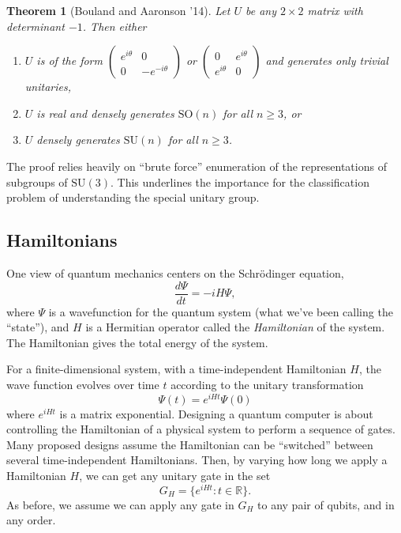 \documentclass[11pt]{report}
\theoremstyle{plain}
\newtheorem{theorem}{Theorem}[section]
\theoremstyle{definition}
\newcommand{\R}{{\mathbb R}}
\begin{document}
\begin{theorem}[Bouland and Aaronson '14]
Let $U$ be any $2 \times 2$ matrix with determinant $-1$. Then either
\begin{enumerate}
\item $U$ is of the form $\left(\begin{smallmatrix} e^{i\theta} & 0 \\ 0 & -e^{-i\theta} \end{smallmatrix}\right)$ or $\left(\begin{smallmatrix} 0 & e^{i\theta} \\ e^{i\theta} & 0 \end{smallmatrix}\right)$ and generates only trivial unitaries,
\item $U$ is real and densely generates $\mathrm{SO}(n)$ for all $n \geq 3$, or
\item $U$ densely generates $\mathrm{SU}(n)$ for all $n \geq 3$.
\end{enumerate}
\end{theorem}

The proof relies heavily on ``brute force'' enumeration of the representations of subgroups of $\mathrm{SU}(3)$. This underlines the importance for the classification problem of understanding the special unitary group.

\subsection{Hamiltonians}

One view of quantum mechanics centers on the Schr\"{o}dinger equation,
$$
\frac{d \Psi}{dt} = -i H \Psi,
$$
where $\Psi$ is a wavefunction for the quantum system (what we've been calling the ``state''), and $H$ is a Hermitian operator called the \emph{Hamiltonian} of the system. The Hamiltonian gives the total energy of the system.

For a finite-dimensional system, with a time-independent Hamiltonian $H$, the wave function evolves over time $t$ according to the unitary transformation
$$
\Psi(t) = e^{i H t} \Psi(0)
$$
where $e^{i H t}$ is a matrix exponential. Designing a quantum computer is about controlling the Hamiltonian of a physical system to perform a sequence of gates. Many proposed designs assume the Hamiltonian can be ``switched'' between several time-independent Hamiltonians. Then, by varying how long we apply a Hamiltonian $H$, we can get any unitary gate in the set
$$
G_H = \{ e^{iHt} : t \in \R \}.
$$
As before, we assume we can apply any gate in $G_H$ to any pair of qubits, and in any order.
\end{document}
